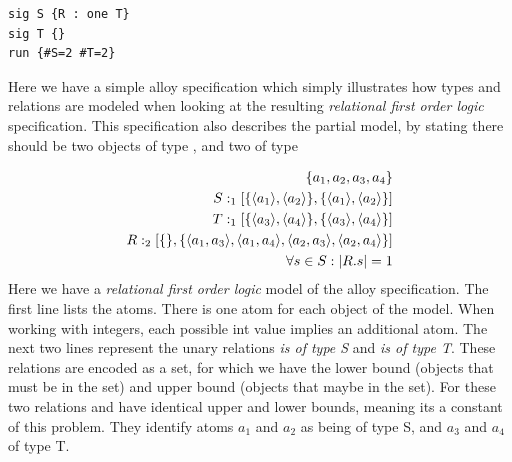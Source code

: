 
\begin{listing}
\begin{lstlisting}
sig S {R : one T}
sig T {}
run {#S=2 #T=2}
\end{lstlisting}
\caption{Simple Alloy model, with two related concepts, with two instances each}
\end{listing}
Here we have a simple alloy specification which simply illustrates how types and relations are modeled when looking at the resulting \textit{relational first order logic} specification.
This specification also describes the partial model, by stating there should be two objects of type , and two of type 

\begin{equation}\label{eq:RFOL:base}
    \begin{aligned}
        \{a_1,a_2,a_3,a_4\}\\
        S :_1 [\{\langle a_1\rangle,\langle a_2\rangle\},\{\langle a_1\rangle,\langle a_2\rangle\}]\\
        T :_1 [\{\langle a_3\rangle,\langle a_4\rangle\},\{\langle a_3\rangle,\langle a_4\rangle\}]\\
        R :_2 [\{\},\{\langle a_1,a_3\rangle,\langle a_1,a_4\rangle,\langle a_2,a_3\rangle,\langle a_2,a_4\rangle\}]\\
        \forall s \in S : \vert R.s\vert = 1
    \end{aligned}
\end{equation}
Here we have a \textit{relational first order logic} model of the alloy specification.
The first line lists the atoms. 
There is one atom for each object of the model.
When working with integers, each possible int value implies an additional atom.
The next two lines represent the unary relations \textit{is of type S} and \textit{is of type T}.
These relations are encoded as a set, for which we have the lower bound (objects that must be in the set) and upper bound (objects that maybe in the set).
For these two relations  and  have identical upper and lower bounds, meaning its a constant of this problem.
They identify atoms $a_1$ and $a_2$ as being of type S, and $a_3$ and $a_4$ of type T.

